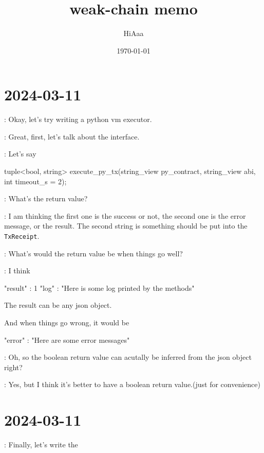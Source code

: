 \documentclass[dvipsnames]{article}
\title{weak-chain memo}
\date{\today}
\author{HiAaa}
\begin{document}
\maketitle
\tableofcontents{}
\newpage{}

% 
% 
% 
% 

\section*{2024-03-11}

 :  Okay, let's try writing a python vm executor.

 : Great, first, let's talk about the interface.

 : Let's say

\begin{simplec}
tuple<bool, string> execute_py_tx(string_view py_contract, string_view abi, int timeout_s = 2);
\end{simplec}

 : What's the return value?

 : I am thinking the first one is the success or not, the second
one is the error message, or the result. The second string is something should
be put into the \texttt{TxReceipt}.

 : What's would the return value be when things go well?

 : I think

\begin{simplejs}
{
    "result" : 1
    "log" : "Here is some log printed by the methods"
}
\end{simplejs}

The result can be any json object.

And when things go wrong, it would be
\begin{simplejs}
{
    "error" : "Here are some error messages"
}
\end{simplejs}

 : Oh, so the boolean return value can acutally be inferred from
the json object right?

 : Yes, but I think it's better to have a boolean return
value.(just for convenience)

\section*{2024-03-11}

 : Finally, let's write the 
\end{document}
